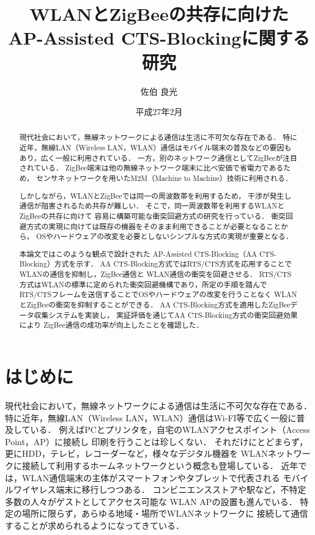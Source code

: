 \documentclass[12pt]{jreport}
\date{平成27年2月}
\title{WLANとZigBeeの共存に向けた\\AP-Assisted CTS-Blockingに関する研究}
\author{佐伯 良光}
\begin{document}
\maketitle

\begin{abstract}
現代社会において，無線ネットワークによる通信は生活に不可欠な存在である．
特に近年，無線LAN（Wireless LAN，WLAN）通信はモバイル端末の普及などの要因も
あり，広く一般に利用されている．
一方，別のネットワーク通信としてZigBeeが注目されている．
ZigBee端末は他の無線ネットワーク端末に比べ安価で省電力であるため，
センサネットワークを用いたM2M（Machine to Machine）技術に利用される．

しかしながら，WLANとZigBeeでは同一の周波数帯を利用するため，
干渉が発生し通信が阻害されるため共存が難しい．
そこで，同一周波数帯を利用するWLANとZigBeeの共存に向けて
容易に構築可能な衝突回避方式の研究を行っている．
衝突回避方式の実現に向けては既存の機器をそのまま利用できることが必要となることから，
OSやハードウェアの改変を必要としないシンプルな方式の実現が重要となる．

本論文ではこのような観点で設計された
AP-Assisted CTS-Blocking（AA CTS-Blocking）方式を示す．
AA CTS-Blocking方式ではRTS/CTS方式を応用することでWLANの通信を抑制し，ZigBee通信と
WLAN通信の衝突を回避させる．
RTS/CTS方式はWLANの標準に定められた衝突回避機構であり，所定の手順を踏んで
RTS/CTSフレームを送信することでOSやハードウェアの改変を行うことなく
WLANとZigBeeの衝突を抑制することができる．
AA CTS-Blocking方式を適用したZigBeeデータ収集システムを実装し，
実証評価を通じてAA CTS-Blocking方式の衝突回避効果により
ZigBee通信の成功率が向上したことを確認した．


\end{abstract}


\tableofcontents

\newpage



\chapter{はじめに}\label{intro}%
現代社会において，無線ネットワークによる通信は生活に不可欠な存在である．
特に近年，無線LAN（Wireless LAN，WLAN）通信はWi-FI等で広く一般に普及している．
例えばPCとプリンタを，自宅のWLANアクセスポイント（Access Point，AP）に接続し
印刷を行うことは珍しくない．
それだけにとどまらず，更にHDD，テレビ，レコーダーなど，様々なデジタル機器を
WLANネットワークに接続して利用するホームネットワークという概念も登場している．
近年では，WLAN通信端末の主体がスマートフォンやタブレットで代表される
モバイルワイヤレス端末に移行しつつある．
コンビニエンスストアや駅など，不特定多数の人々がゲストとしてアクセス可能な
WLAN APの設置も進んでいる．
特定の場所に限らず，あらゆる地域・場所でWLANネットワークに
接続して通信することが求められるようになってきている．
\end{document}
